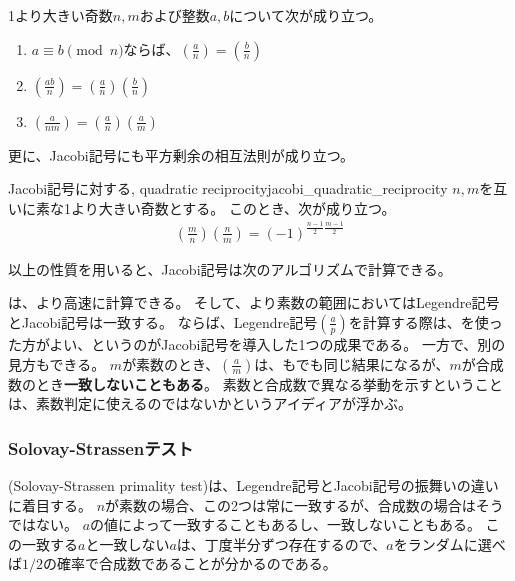\begin{Prop}{}{}
1より大きい奇数$n,m$および整数$a,b$について次が成り立つ。
\begin{enumerate}
\item $a\equiv b \pmod{n}$ならば、$\left(\frac{a}{n}\right)=\left(\frac{b}{n}\right)$
\item $\left(\frac{ab}{n}\right)=\left(\frac{a}{n}\right)\left(\frac{b}{n}\right)$
\item $\left(\frac{a}{nm}\right)=\left(\frac{a}{n}\right)\left(\frac{a}{m}\right)$
\end{enumerate}
\end{Prop}

更に、Jacobi記号にも平方剰余の相互法則が成り立つ。

\begin{Theo}{Jacobi記号に対する, quadratic reciprocity}{jacobi_quadratic_reciprocity}
$n,m$を互いに素な1より大きい奇数とする。
このとき、次が成り立つ。
\begin{align*}
\left(\frac{m}{n}\right)\left(\frac{n}{m}\right) = (-1)^{\frac{n-1}{2}\frac{m-1}{2}}
\end{align*}
\end{Theo}

以上の性質を用いると、Jacobi記号は次のアルゴリズムで計算できる。


は、より高速に計算できる。
そして、より素数の範囲においてはLegendre記号とJacobi記号は一致する。
ならば、Legendre記号$\left(\frac{a}{p}\right)$を計算する際は、を使った方がよい、というのがJacobi記号を導入した1つの成果である。
一方で、別の見方もできる。
$m$が素数のとき、$\left(\frac{a}{m}\right)$は、もでも同じ結果になるが、$m$が合成数のとき\textbf{一致しないこともある}。
素数と合成数で異なる挙動を示すということは、素数判定に使えるのではないかというアイディアが浮かぶ。

\subsubsection{Solovay-Strassenテスト}
(Solovay-Strassen primality test)\cite{DBLP:journals/siamcomp/SolovayS77}は、Legendre記号とJacobi記号の振舞いの違いに着目する。
$n$が素数の場合、この2つは常に一致するが、合成数の場合はそうではない。
$a$の値によって一致することもあるし、一致しないこともある。
この一致する$a$と一致しない$a$は、丁度半分ずつ存在するので、$a$をランダムに選べば$1/2$の確率で合成数であることが分かるのである。

